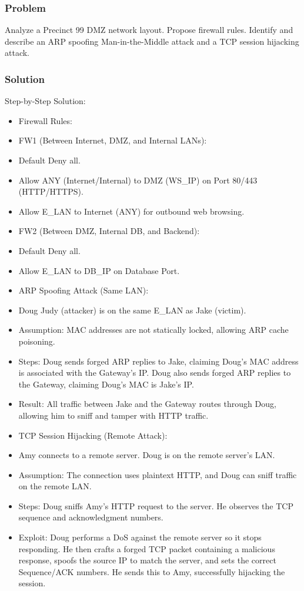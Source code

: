 \documentclass{article}
\begin{document}
\subsubsection*{Problem}
Analyze a Precinct 99 DMZ network layout. Propose firewall rules. Identify and describe an ARP spoofing Man-in-the-Middle attack and a TCP session hijacking attack.

\subsubsection*{Solution}
Step-by-Step Solution:

\begin{itemize}
    \item[\textbf{1.}] Firewall Rules:
    \item FW1 (Between Internet, DMZ, and Internal LANs):
    \item Default Deny all.
    \item Allow ANY (Internet/Internal) to DMZ (WS\_IP) on Port 80/443 (HTTP/HTTPS).
    \item Allow E\_LAN to Internet (ANY) for outbound web browsing.
    \item FW2 (Between DMZ, Internal DB, and Backend):
    \item Default Deny all.
    \item Allow E\_LAN to DB\_IP on Database Port.

    \item[\textbf{2.}] ARP Spoofing Attack (Same LAN):
    \item Doug Judy (attacker) is on the same E\_LAN as Jake (victim).
    \item Assumption: MAC addresses are not statically locked, allowing ARP cache poisoning.
    \item Steps: Doug sends forged ARP replies to Jake, claiming Doug's MAC address is associated with the Gateway's IP. Doug also sends forged ARP replies to the Gateway, claiming Doug's MAC is Jake's IP.
    \item Result: All traffic between Jake and the Gateway routes through Doug, allowing him to sniff and tamper with HTTP traffic.

    \item[\textbf{3.}] TCP Session Hijacking (Remote Attack):
    \item Amy connects to a remote server. Doug is on the remote server's LAN.
    \item Assumption: The connection uses plaintext HTTP, and Doug can sniff traffic on the remote LAN.
    \item Steps: Doug sniffs Amy's HTTP request to the server. He observes the TCP sequence and acknowledgment numbers.
    \item Exploit: Doug performs a DoS against the remote server so it stops responding. He then crafts a forged TCP packet containing a malicious response, spoofs the source IP to match the server, and sets the correct Sequence/ACK numbers. He sends this to Amy, successfully hijacking the session.
\end{itemize}
\end{document}
